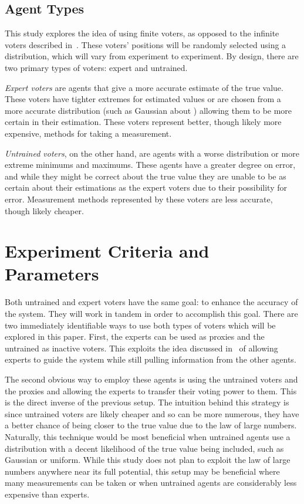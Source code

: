 
\subsection{Agent Types}\label{subsec:agent-types}
This study explores the idea of using finite voters, as opposed to the
infinite voters described in~\cite{Cohensius2017}.
These voters' positions will be randomly selected using a distribution, which
will vary from experiment to experiment.
By design, there are two primary types of voters: expert and untrained.

\textit{Expert voters} are agents that give a more accurate estimate of the
true value.
These voters have tighter extremes for estimated values or are chosen from
a more accurate distribution (such as Gaussian about \truth) allowing
them to be more certain in their estimation.
These voters represent better, though likely more expensive, methods for
taking a measurement.  %

\textit{Untrained voters}, on the other hand, are agents with a worse
distribution or more extreme minimums and maximums.
These agents have a greater degree on error, and while they might be correct
about the true value they are unable to be as certain about their estimations
as the expert voters due to their possibility for error.
Measurement methods represented by these voters are less accurate, though
likely cheaper.  %


\section{Experiment Criteria and Parameters}\label{sec:experiment-criteria
-and-parameters}
Both untrained and expert voters have the same goal: to enhance the accuracy of
the system.
They will work in tandem in order to accomplish this goal.
There are two immediately identifiable ways to use both types of voters which
will be explored in this paper.
First, the experts can be used as proxies and the untrained as inactive voters.
This exploits the idea discussed in~\cite{Miller1969, Mueller1972} of
allowing experts to guide the system while still pulling information from the
other agents.

The second obvious way to employ these agents is using the untrained voters
and the proxies and allowing the experts to transfer their voting power to them.
This is the direct inverse of the previous setup.
The intuition behind this strategy is since untrained voters are likely
cheaper and so can be more numerous, they have a better chance of being closer
to the true value due to the law of large numbers.
Naturally, this technique would be most beneficial when untrained agents use a
distribution with a decent likelihood of the true value being included, such
as Gaussian or uniform.
While this study does not plan to exploit the law of large numbers anywhere
near its full potential, this setup may be beneficial where many measurements
can be taken or when untrained agents are considerably less expensive than
experts.


